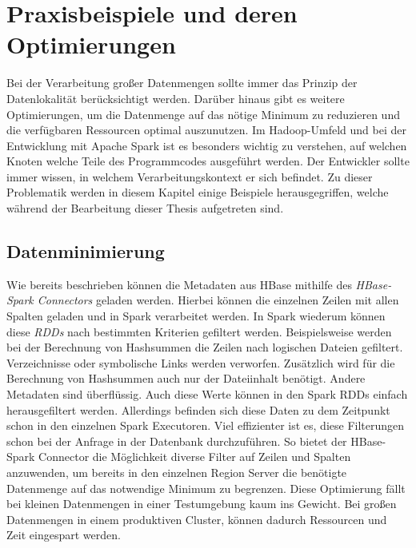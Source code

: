 \section{Praxisbeispiele und deren Optimierungen}
Bei der Verarbeitung großer Datenmengen sollte immer das Prinzip der Datenlokalität berücksichtigt werden. Darüber hinaus gibt es weitere Optimierungen, um die Datenmenge auf das nötige Minimum zu reduzieren und die verfügbaren Ressourcen optimal auszunutzen. Im Hadoop-Umfeld und bei der Entwicklung mit Apache Spark ist es besonders wichtig zu verstehen, auf welchen Knoten welche Teile des Programmcodes ausgeführt werden. Der Entwickler sollte immer wissen, in welchem Verarbeitungskontext er sich befindet. Zu dieser Problematik werden in diesem Kapitel einige Beispiele herausgegriffen, welche während der Bearbeitung dieser Thesis aufgetreten sind.\\

\subsection*{Datenminimierung}
Wie bereits beschrieben können die Metadaten aus HBase mithilfe des \textit{HBase-Spark Connectors} geladen werden. Hierbei können die einzelnen Zeilen mit allen Spalten geladen und in Spark verarbeitet werden. In Spark wiederum können diese \textit{RDDs} nach bestimmten Kriterien gefiltert werden. Beispielsweise werden bei der Berechnung von Hashsummen die Zeilen nach logischen Dateien gefiltert. Verzeichnisse oder symbolische Links werden verworfen. Zusätzlich wird für die Berechnung von Hashsummen auch nur der Dateiinhalt benötigt. Andere Metadaten sind überflüssig. Auch diese Werte können in den Spark RDDs einfach herausgefiltert werden. Allerdings befinden sich diese Daten zu dem Zeitpunkt schon in den einzelnen Spark Executoren. Viel effizienter ist es, diese Filterungen schon bei der Anfrage in der Datenbank durchzuführen. So bietet der HBase-Spark Connector die Möglichkeit diverse Filter auf Zeilen und Spalten anzuwenden, um bereits in den einzelnen Region Server die benötigte Datenmenge auf das notwendige Minimum zu begrenzen. Diese Optimierung fällt bei kleinen Datenmengen in einer Testumgebung kaum ins Gewicht. Bei großen Datenmengen in einem produktiven Cluster, können dadurch Ressourcen und Zeit eingespart werden.\\

